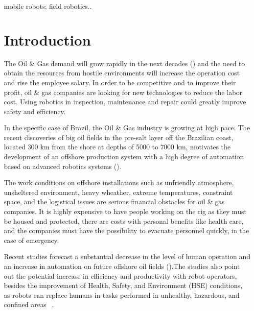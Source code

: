 \documentclass{ifacconf}
\begin{document}
\begin{frontmatter}
\begin{keyword}
mobile robots; field robotics..
\end{keyword}

\end{frontmatter}

\section{Introduction}
The Oil \& Gas demand will grow rapidly in the next decades (\cite{wna}) and the
need to obtain the resources from hostile environments will increase the
operation cost and rise the employee salary. In order to be competitive
and to improve their profit, oil \& gas companies are looking for new
technologies to reduce the labor cost. Using robotics in inspection, maintenance
and repair could greatly improve safety and efficiency. 

In the specific case of Brazil, the Oil \& Gas industry is growing at high pace.
The recent discoveries of big oil fields in the pre-salt layer off the Brazilian
coast, located 300 km from the shore at depths of 5000 to 7000 km, motivates the
development of an offshore  production system with a high degree of automation
based on advanced robotics systems (\cite{OTC}).

The work conditions on offshore installations such as unfriendly atmosphere,
unsheltered environment, heavy wheather, extreme temperatures, constraint space,
and the logistical issues are serious financial obstacles for oil \& gas
companies. It is highly expensive to have people working on the rig as they must
be housed and protected, there are costs with personal benefits like health
care, and the companies must have the possibility to evacuate personnel quickly,
in the case of emergency.

Recent studies forecast a substantial decrease in the level of human operation
and an increase in automation on future offshore oil fields
(\cite{skourup2009robotized}).The studies also point out the potential increase
in efficiency and productivity with robot operators, besides the improvement of
Health, Safety, and Environment (HSE) conditions, as robots can replace humans
in tasks performed in unhealthy, hazardous, and confined areas ~\cite{pal}.
\end{document}
